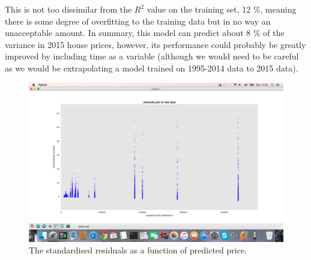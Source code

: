 \documentclass[11pt]{article} %
\begin{document}
 This is not too dissimilar from the $R^2$ value on the training set, 12 \%, meaning there is some degree of overfitting to the training data but in no way an unacceptable amount.  In summary, this model can predict about 8 \% of the variance in 2015 house prices, however, its performance could probably be greatly improved by including time as a variable (although we would need to be careful as we would be extrapolating a model trained on 1995-2014 data to 2015 data).

\begin{figure}
\includegraphics[scale=0.4,trim=30mm 45mm 30mm 35mm, clip]{residuals.png}
\caption{The standardised residuals as a function of predicted price.\label{fig:fige}}
\end{figure}
\end{document}
